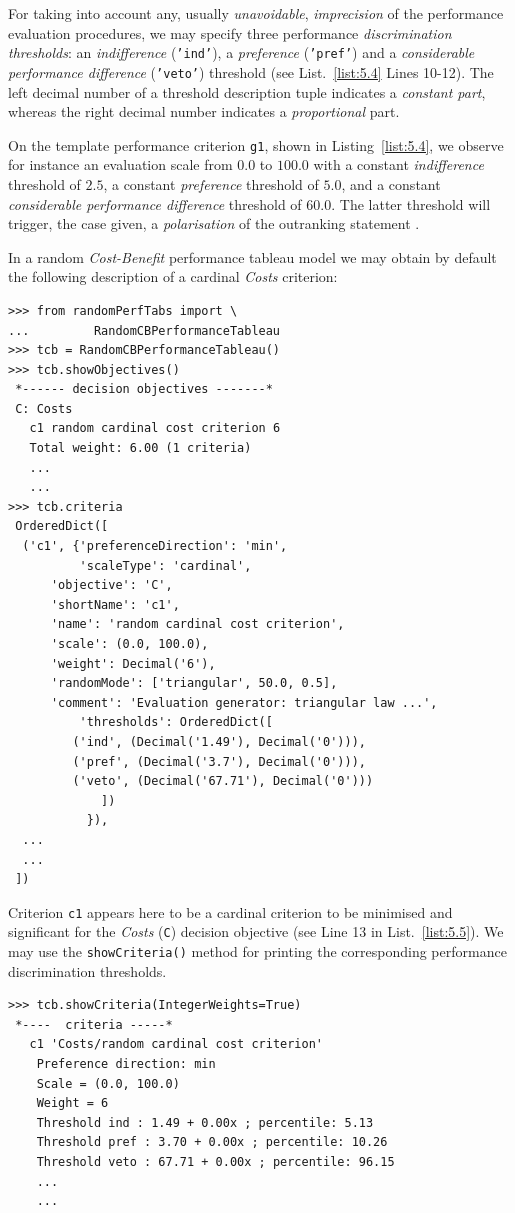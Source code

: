 For taking into account any, usually \emph{unavoidable}, \emph{imprecision} of the performance evaluation procedures, we may specify three performance \emph{discrimination thresholds}: an \emph{indifference} (\texttt{'ind'}), a \emph{preference} (\texttt{'pref'}) and a \emph{considerable performance difference} (\texttt{'veto'}) threshold (see List.~\vref{list:5.4} Lines 10-12). The left decimal number of a threshold description tuple indicates a \emph{constant part}, whereas the right decimal number indicates a \emph{proportional} part.

On the template performance criterion \texttt{g1}, shown in Listing~\vref{list:5.4}, we observe for instance an evaluation scale from $0.0$ to $100.0$ with a constant \emph{indifference} threshold of $2.5$, a constant \emph{preference} threshold of $5.0$, and a constant \emph{considerable performance difference} threshold of $60.0$. The latter threshold  will trigger, the case given, a \emph{polarisation} of the outranking statement \citep{BIS-2013}.

In a random \emph{Cost-Benefit} performance tableau model we may obtain by default the following description of a cardinal \emph{Costs} criterion:
\begin{lstlisting}[caption={Example of cardinal \emph{Costs} criterion},label=list:5.5]
>>> from randomPerfTabs import \
...         RandomCBPerformanceTableau
>>> tcb = RandomCBPerformanceTableau()
>>> tcb.showObjectives()
 *------ decision objectives -------*
 C: Costs
   c1 random cardinal cost criterion 6
   Total weight: 6.00 (1 criteria)
   ...
   ...
>>> tcb.criteria
 OrderedDict([
  ('c1', {'preferenceDirection': 'min',
          'scaleType': 'cardinal',
	  'objective': 'C',
	  'shortName': 'c1',
	  'name': 'random cardinal cost criterion',
	  'scale': (0.0, 100.0),
	  'weight': Decimal('6'),
	  'randomMode': ['triangular', 50.0, 0.5],
	  'comment': 'Evaluation generator: triangular law ...',
          'thresholds': OrderedDict([
	     ('ind', (Decimal('1.49'), Decimal('0'))),
	     ('pref', (Decimal('3.7'), Decimal('0'))),
	     ('veto', (Decimal('67.71'), Decimal('0')))
             ])
           }),
  ...
  ...
 ])
\end{lstlisting}

Criterion \texttt{c1} appears here to be a cardinal criterion to be minimised and significant for the \emph{Costs} (\texttt{C}) decision objective (see Line 13 in List.~\vref{list:5.5}). We may use the \texttt{showCriteria()} method for printing the corresponding performance discrimination thresholds.
\begin{lstlisting}
>>> tcb.showCriteria(IntegerWeights=True)
 *----  criteria -----*
   c1 'Costs/random cardinal cost criterion'
    Preference direction: min
    Scale = (0.0, 100.0)
    Weight = 6 
    Threshold ind : 1.49 + 0.00x ; percentile: 5.13
    Threshold pref : 3.70 + 0.00x ; percentile: 10.26
    Threshold veto : 67.71 + 0.00x ; percentile: 96.15
    ...
    ...
\end{lstlisting}

